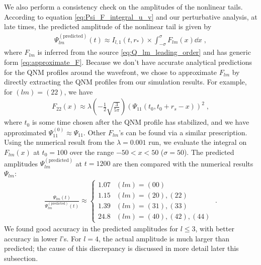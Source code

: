 We also perform a consistency check on the amplitudes of the nonlinear tails.
According to equation \eqref{eq:Psi_F_integral_u_v} and our perturbative analysis, at late times, the predicted amplitude of the nonlinear tail is given by
\begin{align}
  \Psi_{lm}^{(\mathrm{predicted})}(t) \approx I_{l,1}(t,r_*) \times \int_{-\sigma}^\sigma F_{lm}(x) \dd{x} \;,
\end{align}
where $F_{lm}$ is inferred from the source \eqref{eq:Q_lm_leading_order} and has generic form \eqref{eq:approximate_F}.
Because we don't have accurate analytical predictions for the QNM profiles around the wavefront, we chose to approximate $F_{lm}$ by directly extracting the QNM profiles from our simulation results.
For example, for $(lm)=(22)$, we have
\begin{align}
  F_{22}(x)
\approx \lambda \left(-\frac{1}{2}\sqrt{\frac{3}{5\pi}} \right) \left( \Psi_{11}(t_0,t_0+r_s-x) \right)^2 \;,
\end{align}
where $t_0$ is some time chosen after the QNM profile has stabilized, and we have approximated $\Psi_{11}^{(0)} \approx \Psi_{11}$.
Other $F_{lm}$'s can be found via a similar prescription.
Using the numerical result from the $\lambda=0.001$ run, we evaluate the integral on $F_{lm}(x)$ at $t_0=100$ over the range $-50 < x < 50$ ($\sigma = 50$).
The predicted amplitudes $\Psi_{lm}^{(\mathrm{predicted})}$ at $t=1200$ are then compared with the numerical results $\Psi_{lm}$:
\begin{align}
  \label{eq:coupled_tail_amplitude_comparison}
  \frac{\Psi_{lm}(t)}{\Psi_{lm}^{(\mathrm{predicted})}(t)} \approx
  \begin{cases}
    1.07 & (lm) = (00) \\
    1.15 & (lm) = (20), (22) \\
    1.39 & (lm) = (31), (33) \\
    24.8 & (lm) = (40), (42), (44)
  \end{cases}
  \;.
\end{align}
We found good accuracy in the predicted amplitudes for $l \leq 3$, with better accuracy in lower $l$'s.
For $l=4$, the actual amplitude is much larger than predicted; the cause of this discrepancy is discussed in more detail later this subsection.





